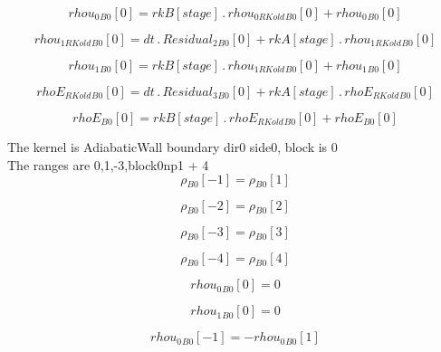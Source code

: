 \documentclass{article}
\begin{document}
\begin{dmath}{rhou_{0}{_{B0}}}[{0}] = {rkB}[{stage}] \,.\, {rhou_{0 RKold}{_{B0}}}[{0}] + {rhou_{0}{_{B0}}}[{0}]\end{dmath}

\begin{dmath}{rhou_{1 RKold}{_{B0}}}[{0}] = dt \,.\, {Residual_{2}{_{B0}}}[{0}] + {rkA}[{stage}] \,.\, {rhou_{1 RKold}{_{B0}}}[{0}]\end{dmath}

\begin{dmath}{rhou_{1}{_{B0}}}[{0}] = {rkB}[{stage}] \,.\, {rhou_{1 RKold}{_{B0}}}[{0}] + {rhou_{1}{_{B0}}}[{0}]\end{dmath}

\begin{dmath}{rhoE_{RKold}{_{B0}}}[{0}] = dt \,.\, {Residual_{3}{_{B0}}}[{0}] + {rkA}[{stage}] \,.\, {rhoE_{RKold}{_{B0}}}[{0}]\end{dmath}

\begin{dmath}{rhoE{_{B0}}}[{0}] = {rkB}[{stage}] \,.\, {rhoE_{RKold}{_{B0}}}[{0}] + {rhoE{_{B0}}}[{0}]\end{dmath}

\noindent The kernel is AdiabaticWall boundary dir0 side0, block is 0\\\noindent The ranges are 0,1,-3,block0np1 + 4\\\begin{dmath}{\rho{_{B0}}}[{-1}] = {\rho{_{B0}}}[{1}]\end{dmath}

\begin{dmath}{\rho{_{B0}}}[{-2}] = {\rho{_{B0}}}[{2}]\end{dmath}

\begin{dmath}{\rho{_{B0}}}[{-3}] = {\rho{_{B0}}}[{3}]\end{dmath}

\begin{dmath}{\rho{_{B0}}}[{-4}] = {\rho{_{B0}}}[{4}]\end{dmath}

\begin{dmath}{rhou_{0}{_{B0}}}[{0}] = 0\end{dmath}

\begin{dmath}{rhou_{1}{_{B0}}}[{0}] = 0\end{dmath}

\begin{dmath}{rhou_{0}{_{B0}}}[{-1}] = - {rhou_{0}{_{B0}}}[{1}]\end{dmath}
\end{document}
